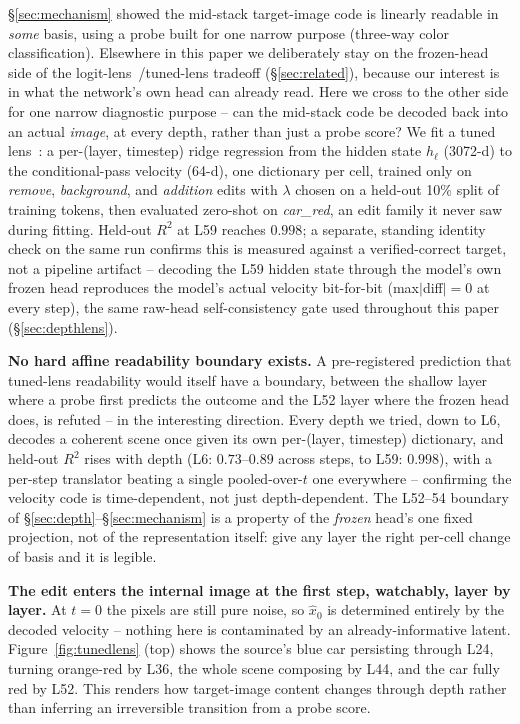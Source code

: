 \documentclass[10pt,twocolumn,letterpaper]{article}
\begin{document}
\S\ref{sec:mechanism} showed the mid-stack target-image code is
linearly readable in \emph{some} basis, using a probe built for one
narrow purpose (three-way color classification). Elsewhere in this
paper we deliberately stay on the frozen-head side of the
logit-lens~\citep{nostalgebraist2020logitlens}/tuned-lens tradeoff
(\S\ref{sec:related}), because our
interest is in what the network's own head can already read. Here we
cross to the other side for one narrow diagnostic purpose -- can the
mid-stack code be decoded back into an actual \emph{image}, at every
depth, rather than just a probe score? We fit a tuned
lens~\citep{belrose2023tuned}: a per-(layer, timestep) ridge
regression from the hidden state $h_\ell$ (3072-d) to the
conditional-pass velocity (64-d), one dictionary per cell, trained
only on \emph{remove}, \emph{background}, and \emph{addition} edits
with $\lambda$ chosen on a held-out 10\% split of training tokens,
then evaluated zero-shot on \emph{car\_red}, an edit family it never
saw during fitting. Held-out $R^2$ at L59 reaches $0.998$; a separate,
standing identity check on the same run confirms this is measured
against a verified-correct target, not a pipeline artifact --
decoding the L59 hidden state through the model's own frozen head
reproduces the model's actual velocity bit-for-bit
(max$|$diff$|=0$ at every step), the same raw-head self-consistency
gate used throughout this paper (\S\ref{sec:depthlens}).

\textbf{No hard affine readability boundary exists.} A pre-registered
prediction that tuned-lens readability would itself have a boundary,
between the shallow layer where a probe first predicts the outcome and
the L52 layer where the frozen head does, is refuted -- in the
interesting direction. Every depth we tried, down to L6, decodes a
coherent scene once given its own per-(layer, timestep) dictionary, and
held-out $R^2$ rises with depth (L6: $0.73$--$0.89$
across steps, to L59: $0.998$), with a per-step translator beating a
single pooled-over-$t$ one everywhere -- confirming the velocity code
is time-dependent, not just depth-dependent. The L52--54 boundary of
\S\ref{sec:depth}--\S\ref{sec:mechanism} is a property of the
\emph{frozen} head's one fixed projection, not of the representation
itself: give any layer the right per-cell change of basis and it is
legible.

\textbf{The edit enters the internal image at the first step,
watchably, layer by layer.} At $t{=}0$ the pixels are still pure
noise, so $\hat x_0$ is determined entirely by the decoded velocity --
nothing here is contaminated by an already-informative latent.
Figure~\ref{fig:tunedlens} (top) shows the source's blue car persisting
through L24, turning orange-red by L36, the whole scene composing by
L44, and the car fully red by L52. This renders how target-image content
changes through depth rather than inferring an irreversible transition
from a probe score.
\end{document}
